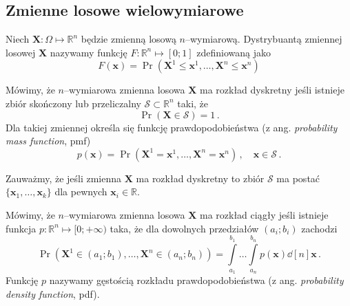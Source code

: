 \documentclass{myclass}
\numberwithin{equation}{subsection}
\begin{document}
\subsection{Zmienne losowe wielowymiarowe}

\begin{definition}
Niech \(\bm{X}: \Omega \mapsto \mathbb{R}^n\) będzie zmienną losową \(n\)--wymiarową. Dystrybuantą
zmiennej losowej \(\bm{X}\) nazywamy funkcję \(F: \mathbb{R}^n \mapsto [0;1]\) zdefiniowaną jako
\begin{equation*}
    F(\bm{x}) = \Pr(\bm{X}^1 \leq \bm{x}^1, \ldots, \bm{X}^n \leq \bm{x}^n)
\end{equation*}
\end{definition}

\begin{definition}
Mówimy, że \(n\)--wymiarowa zmienna losowa \(\bm{X}\) ma rozkład dyskretny jeśli istnieje zbiór
skończony lub przeliczalny \(\mathcal{S} \subset \mathbb{R}^n\) taki, że
\begin{equation*}
    \Pr(\bm{X} \in \mathcal{S}) = 1\,.
\end{equation*}
Dla takiej zmiennej określa się funkcję prawdopodobieństwa (z ang. \textit{probability mass
function}, pmf)
\begin{equation*}
    p(\bm{x}) = \Pr(\bm{X}^1 = \bm{x}^1, \ldots, \bm{X}^n = \bm{x}^n)\,,\quad \bm{x} \in \mathcal{S}\,.
\end{equation*}
\end{definition}

Zauważmy, że jeśli zmienna \(\bm{X}\) ma rozkład dyskretny to zbiór \(\mathcal{S}\) ma postać
\(\{\bm{x}_1,\ldots,\bm{x}_k\}\) dla pewnych \(\bm{x}_i \in \mathbb{R}\).

\begin{definition}
Mówimy, że \(n\)--wymiarowa zmienna losowa \(\bm{X}\) ma rozkład ciągły jeśli istnieje funkcja \(p:
\mathbb{R}^n \mapsto [0;+\infty)\) taka, że dla dowolnych przedziałów \((a_i;b_i)\) zachodzi
\begin{equation*}
    \Pr(\bm{X}^1 \in (a_1;b_1), \ldots, \bm{X}^n \in (a_n;b_n)) = \int\limits_{a_1}^{b_1}\ldots\int\limits_{a_n}^{b_n}p(\bm{x}) \dd[n]{\bm{x}}\,.
\end{equation*}
Funkcję \(p\) nazywamy gęstością rozkładu prawdopodobieństwa (z ang. \textit{probability density
function}, pdf).
\end{definition}
\end{document}
